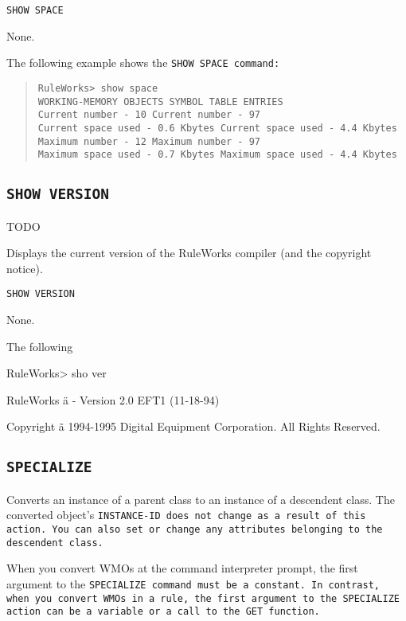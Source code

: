 {{\tt{SHOW SPACE}

\Arguments

None.

\Example

The following example shows the \tt{SHOW SPACE} command:

\begin{quote}
\begin{verbatim}
RuleWorks> show space
WORKING-MEMORY OBJECTS SYMBOL TABLE ENTRIES
Current number - 10 Current number - 97
Current space used - 0.6 Kbytes Current space used - 4.4 Kbytes
Maximum number - 12 Maximum number - 97
Maximum space used - 0.7 Kbytes Maximum space used - 4.4 Kbytes
\end{verbatim}
\end{quote}

\subsection{\tt{SHOW VERSION}}
TODO

Displays the current version of the RuleWorks compiler (and
the copyright notice).

\Format

\tt{SHOW VERSION}

\Arguments

None.

\Example

The following

RuleWorks> sho ver

RuleWorks ä - Version 2.0 EFT1 (11-18-94)

Copyright ã 1994-1995 Digital Equipment Corporation. All
Rights Reserved.

\subsection{\tt{SPECIALIZE}}

Converts an instance of a parent class to an instance of a descendent
class. The converted object's \tt{INSTANCE-ID} does not change as a
result of this action. You can also set or change any attributes
belonging to the descendent class.

\begin{note}
  When you convert WMOs at the command interpreter prompt, the first
  argument to the \tt{SPECIALIZE} command must be a constant. In
  contrast, when you convert WMOs in a rule, the first argument to the
  \tt{SPECIALIZE} action can be a variable or a call to the \tt{GET}
  function.
\end{note}

}}
